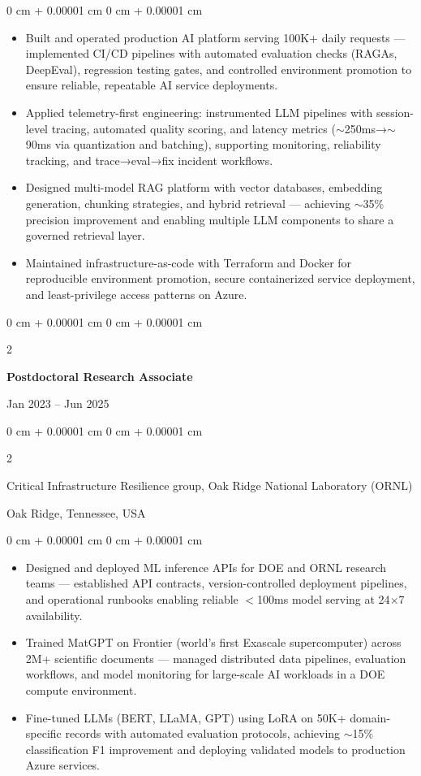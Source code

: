 \documentclass[10pt, letterpaper]{article}
\newenvironment{highlights}{
    \begin{itemize}[
        topsep=0.10 cm,
        parsep=0.10 cm,
        partopsep=0pt,
        itemsep=0pt,
        leftmargin=0 cm + 10pt
    ]
}{
    \end{itemize}
} %
\newenvironment{onecolentry}{
    \begin{adjustwidth}{
        0 cm + 0.00001 cm
    }{
        0 cm + 0.00001 cm
    }
}{
    \end{adjustwidth}
} %
\newenvironment{twocolentry}[2][]{
    \onecolentry
    \def\secondColumn{#2}
    \setcolumnwidth{\fill, 4.5 cm}
    \begin{paracol}{2}
}{
    \switchcolumn \raggedleft \secondColumn
    \end{paracol}
    \endonecolentry
} %
\begin{document}
    \begin{onecolentry}
        \begin{highlights}
            \item Built and operated production AI platform serving 100K+ daily requests — implemented CI/CD pipelines with automated evaluation checks (RAGAs, DeepEval), regression testing gates, and controlled environment promotion to ensure reliable, repeatable AI service deployments.
            \item Applied telemetry-first engineering: instrumented LLM pipelines with session-level tracing, automated quality scoring, and latency metrics ($\sim$250ms→$\sim$90ms via quantization and batching), supporting monitoring, reliability tracking, and trace→eval→fix incident workflows.
            \item Designed multi-model RAG platform with vector databases, embedding generation, chunking strategies, and hybrid retrieval — achieving $\sim$35\% precision improvement and enabling multiple LLM components to share a governed retrieval layer.
            \item Maintained infrastructure-as-code with Terraform and Docker for reproducible environment promotion, secure containerized service deployment, and least-privilege access patterns on Azure.
        \end{highlights}
    \end{onecolentry}

\vspace{1mm}

    \begin{twocolentry}{Jan 2023 -- Jun 2025}
        \textbf{Postdoctoral Research Associate}
    \end{twocolentry}
    \begin{twocolentry}{Oak Ridge, Tennessee, USA}
        Critical Infrastructure Resilience group, Oak Ridge National Laboratory (ORNL)
    \end{twocolentry}
    \vspace{0.10 cm}
    \begin{onecolentry}
        \begin{highlights}
            \item Designed and deployed ML inference APIs for DOE and ORNL research teams — established API contracts, version-controlled deployment pipelines, and operational runbooks enabling reliable $<$100ms model serving at 24$\times$7 availability.
            \item Trained MatGPT on Frontier (world’s first Exascale supercomputer) across 2M+ scientific documents — managed distributed data pipelines, evaluation workflows, and model monitoring for large-scale AI workloads in a DOE compute environment.
            \item Fine-tuned LLMs (BERT, LLaMA, GPT) using LoRA on 50K+ domain-specific records with automated evaluation protocols, achieving $\sim$15\% classification F1 improvement and deploying validated models to production Azure services.
        \end{highlights}
    \end{onecolentry}
\end{document}

